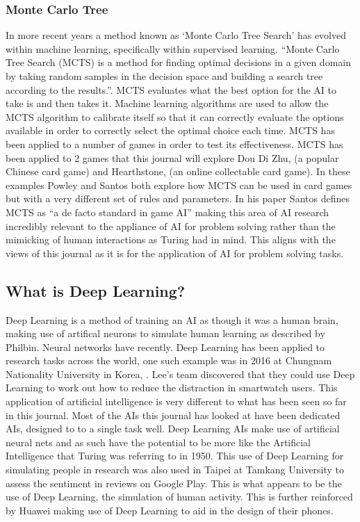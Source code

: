 \documentclass[10pt,a4paper]{scrartcl}
\begin{document}
			\subsubsection{Monte Carlo Tree}
				In more recent years a method known as `Monte Carlo Tree Search' has evolved within machine learning, specifically within supervised learning. ``Monte Carlo Tree Search (MCTS) is a method for finding optimal decisions in a given domain by taking random samples in the decision space and building a search tree according to the results.''\cite{MonteCarloSurvey}. MCTS evaluates what the best option for the AI to take is and then takes it. Machine learning algorithms are used to allow the MCTS algorithm to calibrate itself so that it can correctly evaluate the options available in order to correctly select the optimal choice each time. MCTS has been applied to a number of games in order to test its effectiveness. MCTS has been applied to 2 games that this journal will explore Dou Di Zhu, (a popular Chinese card game)\cite{DouDiZhuMCTS} and Hearthstone, (an online collectable card game)\cite{HearthstoneMCTS}. In these examples Powley and Santos both explore how MCTS can be used in card games but with a very different set of rules and parameters. In his paper Santos defines MCTS as ``a de facto standard in game AI''\cite{HearthstoneMCTS} making this area of AI research incredibly relevant to the appliance of AI for problem solving rather than the mimicking of human interactions as Turing had in mind. This aligns with the views of this journal as it is for the application of AI for problem solving tasks.


		\subsection{What is Deep Learning?}
		Deep Learning is a method of training an AI as though it was a human brain, making use of artifical neurons to simulate human learning as described by Philbin\cite{CrashCourse}. Neural networks have recently. Deep Learning has been applied to research tasks across the world, one such example was in 2016 at Chungnam Nationality University in Korea, \cite{DeepLearningSmartwatches}. Lee's team discovered that they could use Deep Learning to work out how to reduce the distraction in smartwatch users. This application of artificial intelligence is very different to what has been seen so far in this journal. Most of the AIs this journal has looked at have been dedicated AIs, designed to to a single task well. Deep Learning AIs make use of artificial neural nets\cite{CrashCourse} and as such have the potential to be more like the Artificial Intelligence that Turing was referring to in 1950\cite{turingComputing}. This use of Deep Learning for simulating people in research was also used in Taipei at Tamkang University to assess the sentiment in reviews on Google Play\cite{GooglePlayTaipei}. This is what appears to be the use of Deep Learning, the simulation of human activity. This is further reinforced by Huawei making use of Deep Learning to aid in the design of their phones\cite{huawei}.
\end{document}
